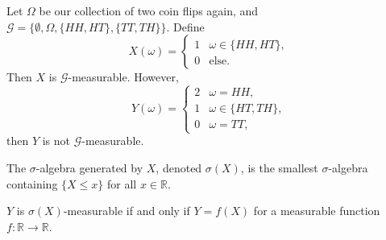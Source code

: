 \documentclass[12pt]{article}
\begin{document}
\begin{exbox}
	Let $\Omega$ be our collection of two coin flips again, and $\mathcal{G} = \{\emptyset, \Omega, \{HH, HT\}, \{TT, TH\}\}$. Define
	\[
	X(\omega) =
	\begin{cases}
		1 & \omega \in \{HH, HT\}, \\
		0 &\text{else}.
	\end{cases}
	\]
	Then $X$ is $\mathcal{G}$-measurable. However,
	\[
	Y(\omega) =
	\begin{cases}
		2 & \omega = HH,\\
		1 & \omega \in \{HT, TH\},\\
		0 & \omega = TT,
	\end{cases}
	\]
	then $Y$ is not $\mathcal{G}$-measurable.
\end{exbox}

\begin{definition}
	The $\sigma$-algebra generated by $X$, denoted $\sigma(X)$, is the smallest $\sigma$-algebra containing $\{X \leq x\}$ for all $x \in \mathbb{R}$.
\end{definition}

\begin{theorem}
	$Y$ is $\sigma(X)$-measurable if and only if $Y = f(X)$ for a measurable function $f : \mathbb{R} \to \mathbb{R}$.
\end{theorem}


\newpage

\printindex
\end{document}
